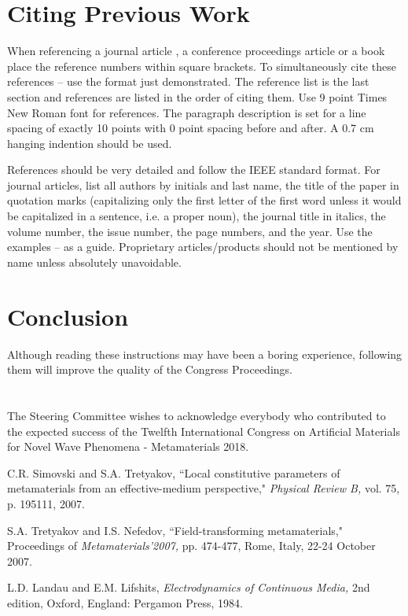 \documentclass[10pt,a4paper]{article}
\newcommand{\acknowledgement}{\section*{\centering{\textnormal{\normalsize{\textsc{Acknowledgement}}}}}}
\begin{document}
\section{Citing Previous Work}

When referencing a journal article \cite{paper}, a conference proceedings article \cite{in proceedings} or a book \cite{Z} place the reference numbers within square brackets. To simultaneously cite these references \cite{paper}--\cite{Z} use the format just demonstrated. The reference list is the last section and references are listed in the order of citing them. Use 9 point Times New Roman font for references. The paragraph description is set for a line spacing of exactly 10 points with 0 point spacing before and after. A 0.7 cm hanging indention should be used.

References should be very detailed and follow the IEEE standard format. For journal articles, list all authors by initials and last name, the title of the paper in quotation marks (capitalizing only the first letter of the first word unless it would be capitalized in a sentence, i.e. a proper noun), the journal title in italics, the volume number, the issue number, the page numbers, and the year. Use the examples \cite{paper}--\cite{Z} as a guide. Proprietary articles/products should not be mentioned by name unless absolutely unavoidable.

\section{Conclusion}
Although reading these instructions may have been a boring experience, following them will improve the quality of the Congress Proceedings.

\acknowledgement
The Steering Committee wishes to acknowledge everybody who contributed to the expected success of the Twelfth International Congress on Artificial Materials for Novel Wave Phenomena - Metamaterials 2018.


{\small

\begin{thebibliography}{10}
\setlength{\itemsep}{-1ex}


C.R. Simovski and S.A. Tretyakov, ``Local constitutive parameters of metamaterials from an
effective-medium perspective," {\itshape Physical Review B,} vol. 75, p. 195111, 2007.


S.A. Tretyakov and I.S. Nefedov, ``Field-transforming metamaterials," Proceedings of {\itshape Metamaterials'2007,} pp. 474-477, Rome, Italy, 22-24 October 2007.


L.D. Landau and E.M.   Lifshits,  {\itshape Electrodynamics of
Continuous Media,} 2nd edition,  Oxford, England: Pergamon Press,
1984.


\end{thebibliography}

}
\end{document}

